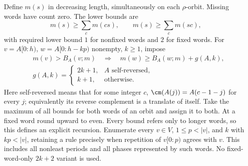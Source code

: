 Define $m(s)$ in decreasing length, simultaneously on each $\rho$-orbit.
Missing words have count zero. The lower bounds are
\begin{equation}\label{eq:extension}
m(s)\ge\sum_c m(cs),\qquad m(s)\ge\sum_c m(sc),
\end{equation}
with required lower bound $1$ for nonfixed words and $2$ for fixed words.
For $v=A[0:h)$, $w=A[0:h-kp)$ nonempty, $k\ge1$, impose
\begin{equation}\label{eq:new-rule}
\begin{aligned}
&m(v)>B_A(v;m)\quad\Longrightarrow\quad m(w)\ge B_A(w;m)+g(A,k),\\
&g(A,k)=\begin{cases}2k+1,&A\text{ self-reversed},\\ k+1,&\text{otherwise}.
\end{cases}
\end{aligned}
\end{equation}
Here self-reversed means that for some integer $c$,
$\cm(A(j))=A(c-1-j)$ for every $j$; equivalently its reverse complement
is a translate of itself. Take the maximum of all bounds for both words
of an orbit and assign it to both. At a fixed word round upward to even.
Every bound refers only to longer words, so this defines an explicit
recursion. Enumerate every $v\in V$, $1\le p<|v|$, and $k$ with
$kp<|v|$, retaining a rule precisely when repetition of $v[0:p)$ agrees
with $v$. This includes all nonleast periods and all phases represented
by such words. No fixed-word-only $2k+2$ variant is used.

